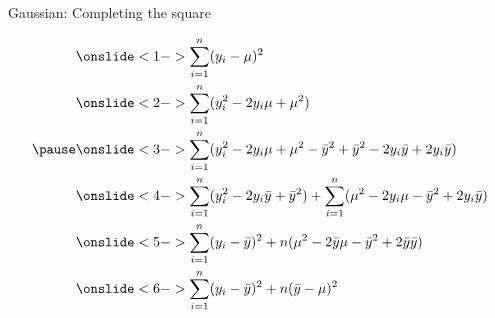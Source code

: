 \documentclass[10pt]{beamer}
\begin{document}
\begin{frame}{Gaussian: Completing the square}

  \vspace{-\baselineskip}
 \begin{align*}
   &\onslide<1->{\sum_{i=1}^n(y_i-\mu)^2}\\
   &\onslide<2->{\sum_{i=1}^n(y_i^2-2 y_i \mu + \mu^2)}\\
\pause
   &\onslide<3->{\sum_{i=1}^n(y_i^2-2 y_i \mu + \mu^2 -\bar{y}^2 + \bar{y}^2 - 2 y_i \bar{y} + 2 y_i \bar{y})}\\
   &\onslide<4->{\sum_{i=1}^n(y_i^2-2 y_i \bar{y} + \bar{y}^2) + \sum_{i=1}^n(\mu^2 - 2 y_i \mu -\bar{y}^2  + 2 y_i \bar{y})}\\
   &\onslide<5->{\sum_{i=1}^n(y_i-\bar{y})^2 + n(\mu^2 -  2\bar{y}\mu -\bar{y}^2  + 2 \bar{y}\bar{y})}\\
   &\onslide<6->{\sum_{i=1}^n(y_i-\bar{y})^2 + n(\bar{y}-\mu)^2}
 \end{align*}

\end{frame}
\end{document}
